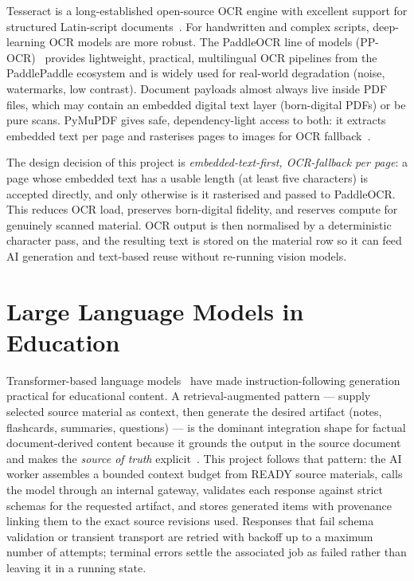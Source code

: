 Tesseract is a long-established open-source OCR engine with excellent
support for structured Latin-script documents~\cite{tesseract}. For
handwritten and complex scripts, deep-learning OCR models are more robust.
The PaddleOCR line of models (PP-OCR)~\cite{ppocr} provides lightweight,
practical, multilingual OCR pipelines from the PaddlePaddle ecosystem and is
widely used for real-world degradation (noise, watermarks, low contrast).
Document payloads almost always live inside PDF files, which may contain an
embedded digital text layer (born-digital PDFs) or be pure scans. PyMuPDF
gives safe, dependency-light access to both: it extracts embedded text per
page and rasterises pages to images for OCR fallback~\cite{pymupdf}.

The design decision of this project is \emph{embedded-text-first, OCR-fallback
per page}: a page whose embedded text has a usable length (at least five
characters) is accepted directly, and only otherwise is it rasterised and
passed to PaddleOCR. This reduces OCR load, preserves born-digital fidelity,
and reserves compute for genuinely scanned material. OCR output is then
normalised by a deterministic character pass, and the resulting text is stored
on the material row so it can feed AI generation and text-based reuse without
re-running vision models.

\section{Large Language Models in Education}

Transformer-based language models~\cite{vaswani2017} have made
instruction-following generation practical for educational content. A
retrieval-augmented pattern --- supply selected source material as context,
then generate the desired artifact (notes, flashcards, summaries, questions)
--- is the dominant integration shape for factual document-derived content
because it grounds the output in the source document and makes the 
\emph{source of truth} explicit~\cite{lewis2020rag}. This project follows that
pattern: the AI worker assembles a bounded context budget from READY source
materials, calls the model through an internal gateway, validates each
response against strict schemas for the requested artifact, and stores
generated items with provenance linking them to the exact source revisions
used. Responses that fail schema validation or transient transport are
retried with backoff up to a maximum number of attempts; terminal errors
settle the associated job as failed rather than leaving it in a running state.

